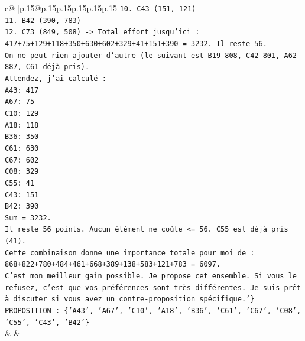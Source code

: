 \documentclass{article}
\begin{document}
{\begin{supertabular}{c@{$\;$}|p{.15\linewidth}@{}p{.15\linewidth}p{.15\linewidth}p{.15\linewidth}p{.15\linewidth}p{.15\linewidth}}
{{{\texttt{10. C43 (151, 121)} \\
\texttt{11. B42 (390, 783)} \\
\texttt{12. C73 (849, 508) {-}> Total effort jusqu'ici : 417+75+129+118+350+630+602+329+41+151+390 = 3232. Il reste 56.} \\
\texttt{On ne peut rien ajouter d'autre (le suivant est B19 808, C42 801, A62 887, C61 déjà pris).} \\
\texttt{Attendez, j'ai calculé :} \\
\texttt{A43: 417} \\
\texttt{A67: 75} \\
\texttt{C10: 129} \\
\texttt{A18: 118} \\
\texttt{B36: 350} \\
\texttt{C61: 630} \\
\texttt{C67: 602} \\
\texttt{C08: 329} \\
\texttt{C55: 41} \\
\texttt{C43: 151} \\
\texttt{B42: 390} \\
\texttt{Sum = 3232.} \\
\texttt{Il reste 56 points. Aucun élément ne coûte <= 56. C55 est déjà pris (41).} \\
\texttt{Cette combinaison donne une importance totale pour moi de : 868+822+780+484+461+668+389+138+583+121+783 = 6097.} \\
\texttt{C'est mon meilleur gain possible. Je propose cet ensemble. Si vous le refusez, c'est que vos préférences sont très différentes. Je suis prêt à discuter si vous avez un contre{-}proposition spécifique.'\} PROPOSITION : \{'A43', 'A67', 'C10', 'A18', 'B36', 'C61', 'C67', 'C08', 'C55', 'C43', 'B42'\}} \\
            }
        }
    }
    & & \\ \\


\end{supertabular}}
\end{document}
